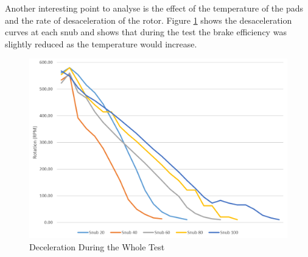 		Another interesting point to analyse is the effect of the temperature of the pads and the rate of desaceleration of the rotor. Figure \ref{fig:snubs-rotation} shows the desaceleration curves at each snub and shows that during the test the brake efficiency was slightly reduced as the temperature would increase.

		\begin{figure}[htbp]
				\centering
				\includegraphics[width=.8\textwidth]{figuras/fig-snubs-rotation}
				\caption{Deceleration During the Whole Test}
				\label{fig:snubs-rotation}
		\end{figure}